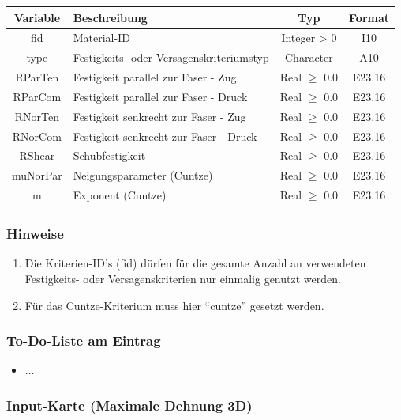 \documentclass[11pt,titlepage,listof=totoc,bibliography=totoc,twoside]{scrreprt}
\begin{document}
{{\begin{tabularx}{\textwidth}{cXcc}
\toprule
Variable& Beschreibung														& Typ			& Format\\
\midrule
fid	& Material-ID														& Integer > 0		& I10	\\
type	& Festigkeits- oder Versagenskriteriumstyp										& Character		& A10	\\
RParTen	& Festigkeit parallel zur Faser - Zug											& Real $\ge$ 0.0	& E23.16\\
RParCom	& Festigkeit parallel zur Faser - Druck											& Real $\ge$ 0.0	& E23.16\\
RNorTen	& Festigkeit senkrecht zur Faser - Zug											& Real $\ge$ 0.0	& E23.16\\
RNorCom	& Festigkeit senkrecht zur Faser - Druck										& Real $\ge$ 0.0	& E23.16\\
RShear	& Schubfestigkeit 													& Real $\ge$ 0.0	& E23.16\\
muNorPar& Neigungsparameter (Cuntze)												& Real $\ge$ 0.0	& E23.16\\
m	& Exponent (Cuntze)													& Real $\ge$ 0.0	& E23.16\\
\bottomrule
\end{tabularx}

\subsubsection{Hinweise}

\begin{enumerate}
\item Die Kriterien-ID's (fid) dürfen für die gesamte Anzahl an verwendeten Festigkeits- oder Versagenskriterien nur einmalig genutzt werden.
\item Für das Cuntze-Kriterium muss hier ``cuntze'' gesetzt werden.
\end{enumerate}

\subsubsection{To-Do-Liste am Eintrag}

\begin{itemize}
\item ...
\end{itemize}

\newpage

\subsubsection{Input-Karte (Maximale Dehnung 3D)}

}}
\end{document}
